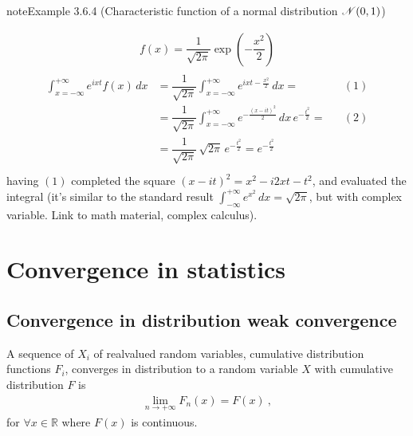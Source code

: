 \documentclass[letterpaper,10pt,english]{jupyterBook}
\begin{document}
\label{ch/prob/characteristic-fun:ex:char-fun:normal}
\begin{sphinxadmonition}{note}{Example 3.6.4 (Characteristic function of a normal distribution \protect\(\mathscr{N}(0,1)\protect\))}


\begin{equation*}
\begin{split}f(x) = \dfrac{1}{\sqrt{2 \pi}} \exp\left( -\dfrac{x^2}{2} \right)\end{split}
\end{equation*}\begin{equation*}
\begin{split}\begin{aligned}
\int_{x=-\infty}^{+\infty} e^{ i x t } f(x) \, dx
& = \dfrac{1}{\sqrt{2 \pi}} \int_{x=-\infty}^{+\infty} e^{ i x t - \frac{x^2}{2} }  \, dx = && (1)  \\
& = \dfrac{1}{\sqrt{2 \pi}} \int_{x=-\infty}^{+\infty} e^{ - \frac{(x-it)^2}{2} }  \, dx \, e^{-\frac{t^2}{2}} = && (2)  \\
& = \dfrac{1}{\sqrt{2 \pi}} \, \sqrt{2 \pi} \, e^{-\frac{t^2}{2}} = e^{-\frac{t^2}{2}}  \\
\end{aligned}\end{split}
\end{equation*}
\sphinxAtStartPar
having \((1)\) completed the square \((x - it)^2 = x^2 - i 2 x t - t^2\), and evaluated the integral  (it’s similar to the standard result \(\int_{-\infty}^{+\infty} e^{x^2} \, dx = \sqrt{2 \pi}\), but with complex variable. Link to math material, complex calculus).
\end{sphinxadmonition}

\sphinxstepscope


\section{Convergence in statistics}
\label{\detokenize{ch/prob/convergence:convergence-in-statistics}}\label{\detokenize{ch/prob/convergence:prob-convergence}}\label{\detokenize{ch/prob/convergence::doc}}

\subsection{Convergence in distribution \sphinxhyphen{} weak convergence}
\label{\detokenize{ch/prob/convergence:convergence-in-distribution-weak-convergence}}\label{\detokenize{ch/prob/convergence:prob-convergence-weak}}
\sphinxAtStartPar
A sequence of \(X_i\) of real\sphinxhyphen{}valued random variables, cumulative distribution functions \(F_i\), converges in distribution to a random variable \(X\) with cumulative distribution \(F\) is
\begin{equation*}
\begin{split}\lim_{n \rightarrow +\infty} F_n(x) = F(x) \ ,\end{split}
\end{equation*}
\sphinxAtStartPar
for \(\forall x \in \mathbb{R}\) where \(F(x)\) is continuous.
\end{document}
